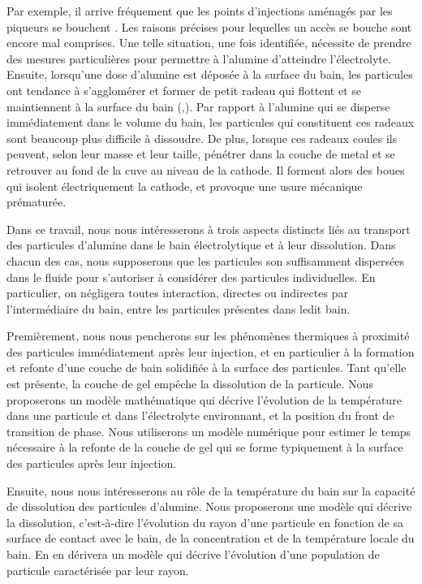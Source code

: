 Par exemple, il arrive fréquement que les points d'injections
aménagés par les piqueurs se bouchent \cite{Dion2017}. Les raisons
précises pour lequelles un accès se bouche sont encore mal
comprises. Une telle situation, une fois identifiée, nécessite de
prendre des mesures particulières pour permettre à l'alumine
d'atteindre l'électrolyte. Ensuite, lorsqu'une dose d'alumine est
déposée à la surface du bain, les particules ont tendance à
s'agglomérer et former de petit radeau qui flottent et se maintiennent
à la surface du bain (\cite{Dassylva-Raymond},\cite{Kaszas2017}). Par
rapport à l'alumine qui se disperse immédiatement dans le volume
du bain, les particules qui constituent ces radeaux sont beaucoup plus
difficile à dissoudre. De plus, lorsque ces radeaux coules ils
peuvent, selon leur masse et leur taille, pénétrer dans la couche
de metal et se retrouver au fond de la cuve au niveau de la
cathode. Il forment alors des boues qui isolent électriquement la
cathode, et provoque une usure mécanique prématurée.

Dans ce travail, nous nous intéresserons à trois aspects distincts
liés au transport des particules d'alumine dans le bain électrolytique
et à leur dissolution. Dans chacun des cas, nous supposerons que les
particules son suffisamment dispersées dans le fluide pour
s'autoriser à considérer des particules individuelles. En particulier,
on négligera toutes interaction, directes ou indirectes par
l'intermédiaire du bain, entre les particules présentes dans ledit bain.

Premièrement, nous nous pencherons sur les phénomènes thermiques à
proximité des particules immédiatement après leur injection, et en
particulier à la formation et refonte d'une couche de bain solidifiée
à la surface des particules. Tant qu'elle est présente, la couche de
gel empêche la dissolution de la particule. Nous proposerons un modèle
mathématique qui décrive l'évolution de la température dans une
particule et dans l'électrolyte environnant, et la position du front
de transition de phase. Nous utiliserons un modèle numérique pour
estimer le temps nécessaire à la refonte de la couche de gel qui se
forme typiquement à la surface des particules après leur injection.

Ensuite, nous nous intéresserons au rôle de la température du bain sur
la capacité de dissolution des particules d'alumine. Nous proposerons
une modèle qui décrive la dissolution, c'est-à-dire l'évolution du
rayon d'une particule en fonction de sa surface de contact avec le
bain, de la concentration et de la température locale du bain. En en
dérivera un modèle qui décrive l'évolution d'une population de
particule caractérisée par leur rayon.

